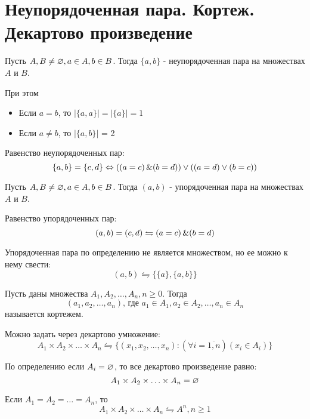 \section{Неупорядоченная пара. Кортеж. Декартово произведение}

\begin{definition}
Пусть $A,B \neq \varnothing, a \in A, b \in B$. Тогда $\{a,b\} $ - неупорядоченная пара
на множествах $A$ и  $B$.
\end{definition}

\medskip

При этом
\begin{itemize}
	\item Если $a=b$, то  $ \left| \{a,a\}  \right| = \left| \{a\}  \right| = 1$ 
	\item Если $a\neq b$, то $\left| \{a,b\}  \right| $ = 2
\end{itemize}

Равенство неупорядоченных пар:
\[
\{a,b\} = \{c,d\} \Leftrightarrow ((a=c)\operatorname{\&}(b=d))\lor((a=d)\lor(b=c))   
\] 
\begin{definition}
Пусть $A,B\neq \varnothing, a \in A, b \in B$. Тогда $(a,b)$ - упорядоченная пара на
множествах  $A$ и  $B$.
\end{definition}

Равенство упорядоченных пар: \[
	(a,b) = (c,d) \leftrightharpoons (a = c)\operatorname{\&}(b=d)
\]

\medskip

Упорядоченная пара по определению не является множеством, но ее можно к нему свести: \[
	(a,b) \leftrightharpoons \{\{a\}, \{a,b\} \} 
\]
\medskip

\begin{definition}
Пусть даны множества $A_1,A_2,\ldots,A_{n}, n\ge 0$. Тогда
\[
	(a_1,a_2,\ldots,a_{n})\text{, где } a_1 \in A_1, a_2 \in A_2,\ldots,a_n \in A_n
\]
называется кортежем.
\end{definition}

\medskip

Можно задать через декартово умножение:
\[
A_1\times A_2\times \ldots\times A_n \leftrightharpoons \{(x_1,x_2,\ldots,x_{n}):
(\forall i=\overline{1,n})(x_{i} \in A_i)\} 
\] 

\medskip

По определению если $A_i = \varnothing$, то все декартово произведение равно:
 \[
A_1\times A_2\times \ldots\times A_n = \varnothing
\] 

\medksip

Если $A_1 = A_2 = \ldots = A_n$, то \[
A_1\times A_2\times \ldots\times A_n \leftrightharpoons A^{n}, n\ge 1
\] 

